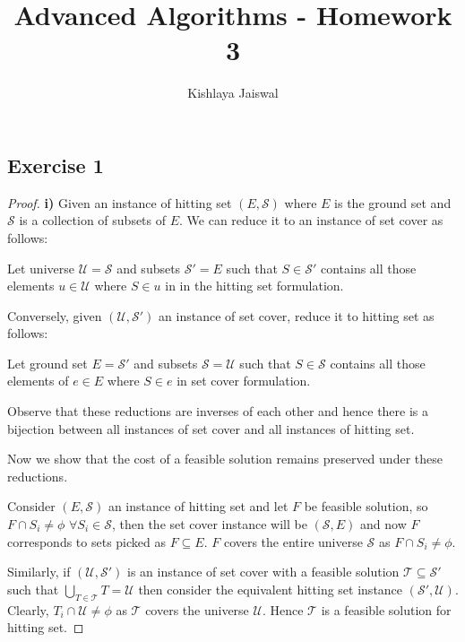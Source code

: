 \documentclass[12pt]{article}
\title{Advanced Algorithms - Homework 3}
\author{Kishlaya Jaiswal}
\begin{document}
\maketitle

\vspace{0.5in}

\subsection*{Exercise 1}

\begin{proof}
\textbf{i)} Given an instance of hitting set $(E, \mathcal{S})$ where $E$ is the ground set and $\mathcal{S}$ is a collection of subsets of $E$. We can reduce it to an instance of set cover as follows:

Let universe $\mathcal{U} = \mathcal{S}$ and subsets $\mathcal{S'} = E$ such that $S \in \mathcal{S'}$ contains all those elements $u \in \mathcal{U}$ where $S \in u$ in in the hitting set formulation.

Conversely, given $(\mathcal{U}, \mathcal{S'})$ an instance of set cover, reduce it to hitting set as follows:

Let ground set $E = \mathcal{S'}$ and subsets $\mathcal{S} = \mathcal{U}$ such that $S \in \mathcal{S}$ contains all those elements of $e \in E$ where $S \in e$ in set cover formulation.

Observe that these reductions are inverses of each other and hence there is a bijection between all instances of set cover and all instances of hitting set. 

Now we show that the cost of a feasible solution remains preserved under these reductions.

Consider $(E, \mathcal{S})$ an instance of hitting set and let $F$ be feasible solution, so $F \cap S_i \neq \phi$ $\forall S_i \in \mathcal{S}$, then the set cover instance will be $(\mathcal{S}, E)$ and now $F$ corresponds to sets picked as $F \subseteq E$. $F$ covers the entire universe $\mathcal{S}$ as $F \cap S_i \neq \phi$.

Similarly, if $(\mathcal{U}, \mathcal{S'})$ is an instance of set cover with a feasible solution $\mathcal{T} \subseteq \mathcal{S'}$ such that $\bigcup_{T \in \mathcal{T}} T = \mathcal{U}$ then consider the equivalent hitting set instance $(\mathcal{S'}, \mathcal{U})$. Clearly, $T_i \cap \mathcal{U} \neq \phi$ as $\mathcal{T}$ covers the universe $\mathcal{U}$. Hence $\mathcal{T}$ is a feasible solution for hitting set.


\end{proof}
\end{document}
